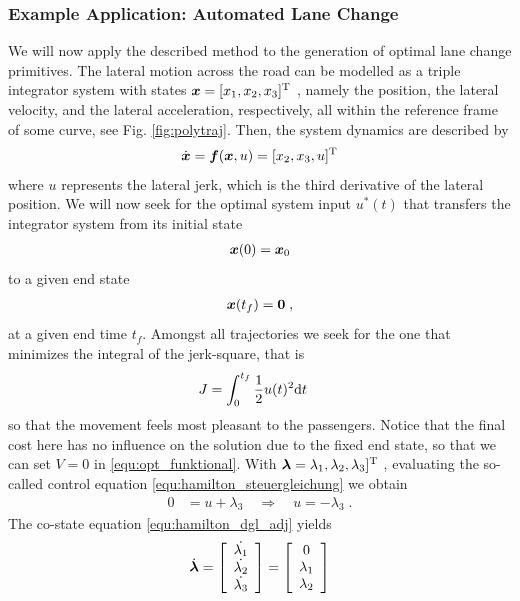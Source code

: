 \subsubsection{Example Application: Automated Lane Change}\label{S:57.3.1.2}
We will now apply the described method to the generation of optimal lane change primitives. The lateral motion across the road can be modelled as a triple integrator system with states $\bs x = [x_1, x_2, x_3]^\T$ , namely the position, the lateral velocity, and the lateral acceleration, respectively, all within the reference frame of some curve, see Fig. \ref{fig:polytraj}.
Then, the system dynamics are described by 
\begin{align}
	\dot{\bs x} = \bs f(\bs x, u) = [x_2, x_3, u ]^\T
	\label{equ:stateeqlc}
\end{align}
where $u$ represents the lateral jerk, which is the third derivative of the lateral position. We will now seek for the optimal system input $u^\ast (t)$  that transfers the integrator system from its initial state
\begin{align}
	\bs x(0) = \bs x_0 \label{equ:x_0}
\end{align}
to a given end state 
\begin{align}
\bs x(t_f) = \bs 0 \;, \label{equ:x_f}
\end{align}
at a given end time $t_f$. Amongst all trajectories we seek for the one that minimizes the integral of the jerk-square, that is
\begin{align}
	J &= %
	\int_{0}^{t_f}\frac{1}{2} u(t)^2 {\rm d} t \label{equ:integrator_J}
\end{align}
so that the movement feels most pleasant to the passengers. Notice that the final cost here has no influence on the solution due to the fixed end state, so that we can set $V=0$ in \eqref{equ:opt_funktional}.
With $\bs \lambda =\lambda_1, \lambda_2, \lambda_3]^\T$ , evaluating the so-called control equation \eqref{equ:hamilton_steuergleichung} we obtain
\begin{align}
	0 &=  u + \lambda_3 \quad \Rightarrow \quad u = -\lambda_3 \;. \label{equ:integrator_u}
\end{align}
The co-state equation \eqref{equ:hamilton_dgl_adj} yields
\begin{align*}
	\dot {\bs \lambda} = 
	\mtrx{c}{\dot{\lambda_1} \\ \dot{\lambda_2} \\ \dot{\lambda_3}}=
	\mtrx{c}{0 \\ \lambda_1 \\ \lambda_2}
\end{align*}
